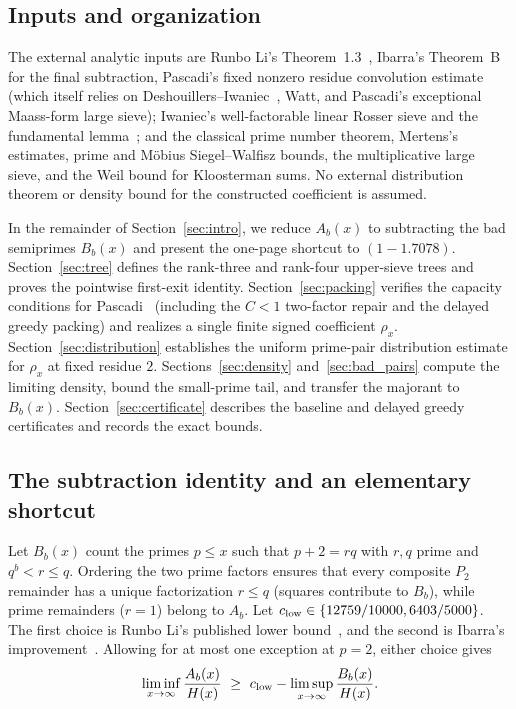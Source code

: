 \documentclass[11pt,reqno]{amsart}
\theoremstyle{remark}
\numberwithin{equation}{section}
\begin{document}
\subsection{Inputs and organization}
The external analytic inputs are Runbo Li's Theorem~1.3~\cite{RunboLi2026}, Ibarra's Theorem~B~\cite{Ibarra2026} for the final subtraction, Pascadi's fixed nonzero residue convolution estimate~\cite[Proposition~4.4]{Pascadi2025} (which itself relies on Deshouillers--Iwaniec~\cite{DeshouillersIwaniec1982}, Watt, and Pascadi's exceptional Maass-form large sieve); Iwaniec's well-factorable linear Rosser sieve and the fundamental lemma~\cite{Iwaniec1980,Iwaniec1980b,FriedlanderIwaniec2010}; and the classical prime number theorem, Mertens's estimates, prime and M\"obius Siegel--Walfisz bounds, the multiplicative large sieve, and the Weil bound for Kloosterman sums. No external distribution theorem or density bound for the constructed coefficient is assumed.

In the remainder of Section~\ref{sec:intro}, we reduce $A_b(x)$ to subtracting the bad semiprimes $B_b(x)$ and present the one-page shortcut to $(1-1.7078)$. Section~\ref{sec:tree} defines the rank-three and rank-four upper-sieve trees and proves the pointwise first-exit identity. Section~\ref{sec:packing} verifies the capacity conditions for Pascadi~\cite[eq.~(4.15)]{Pascadi2025} (including the $C<1$ two-factor repair and the delayed greedy packing) and realizes a single finite signed coefficient $\rho_x$. Section~\ref{sec:distribution} establishes the uniform prime-pair distribution estimate for $\rho_x$ at fixed residue $2$. Sections~\ref{sec:density} and~\ref{sec:bad_pairs} compute the limiting density, bound the small-prime tail, and transfer the majorant to $B_b(x)$. Section~\ref{sec:certificate} describes the baseline and delayed greedy certificates and records the exact bounds.

\subsection{The subtraction identity and an elementary shortcut}
Let $B_b(x)$ count the primes $p \le x$ such that $p+2 = rq$ with $r,q$ prime and $q^b < r \le q$. Ordering the two prime factors ensures that every composite $P_2$ remainder has a unique factorization $r \le q$ (squares contribute to $B_b$), while prime remainders ($r=1$) belong to $A_b$. Let $c_{\rm low}\in\{12759/10000,6403/5000\}$. The first choice is Runbo Li's published lower bound~\cite[Theorem~1.3]{RunboLi2026}, and the second is Ibarra's improvement~\cite[Theorem~B]{Ibarra2026}. Allowing for at most one exception at $p=2$, either choice gives
\begin{equation}\label{eq:sub}
\liminf_{x\to\infty}\frac{A_b(x)}{H(x)}
\ \ge\ c_{\rm low} - \limsup_{x\to\infty}\frac{B_b(x)}{H(x)}.
\end{equation}
\end{document}
